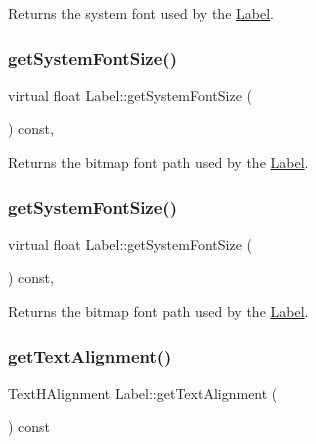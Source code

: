 Returns the system font used by the \hyperlink{classLabel}{Label}. \mbox{\label{classLabel_a9d6aa78ef93d2903019b63d5bcd93fa1}} 
\subsubsection{\texorpdfstring{get\+System\+Font\+Size()}{getSystemFontSize()}\hspace{0.1cm}{\footnotesize\ttfamily [1/2]}}
{\footnotesize\ttfamily virtual float Label\+::get\+System\+Font\+Size (\begin{DoxyParamCaption}{ }\end{DoxyParamCaption}) const\hspace{0.3cm}{\ttfamily [inline]}, {\ttfamily [virtual]}}

Returns the bitmap font path used by the \hyperlink{classLabel}{Label}. \mbox{\label{classLabel_a9d6aa78ef93d2903019b63d5bcd93fa1}} 
\subsubsection{\texorpdfstring{get\+System\+Font\+Size()}{getSystemFontSize()}\hspace{0.1cm}{\footnotesize\ttfamily [2/2]}}
{\footnotesize\ttfamily virtual float Label\+::get\+System\+Font\+Size (\begin{DoxyParamCaption}{ }\end{DoxyParamCaption}) const\hspace{0.3cm}{\ttfamily [inline]}, {\ttfamily [virtual]}}

Returns the bitmap font path used by the \hyperlink{classLabel}{Label}. \mbox{\label{classLabel_aa23acedf74e98f051f47e76c3b1a088c}} 
\subsubsection{\texorpdfstring{get\+Text\+Alignment()}{getTextAlignment()}\hspace{0.1cm}{\footnotesize\ttfamily [1/2]}}
{\footnotesize\ttfamily Text\+H\+Alignment Label\+::get\+Text\+Alignment (\begin{DoxyParamCaption}{ }\end{DoxyParamCaption}) const\hspace{0.3cm}{\ttfamily [inline]}}


